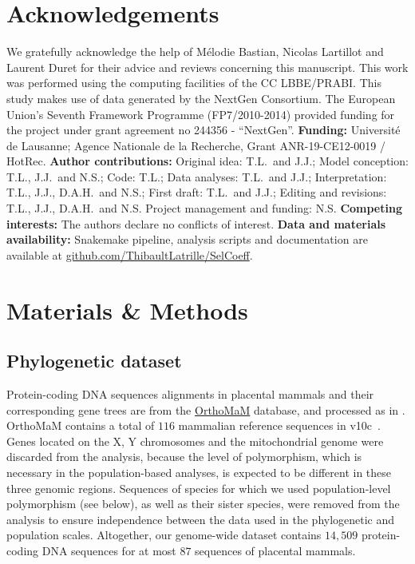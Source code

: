\documentclass{article}
\begin{document}
    \section*{Acknowledgements}
    \label{sec:acknowledgment}
    We gratefully acknowledge the help of Mélodie Bastian, Nicolas Lartillot and Laurent Duret for their advice and reviews concerning this manuscript.
    This work was performed using the computing facilities of the CC LBBE/PRABI\@.
    This study makes use of data generated by the NextGen Consortium.
    The European Union’s Seventh Framework Programme (FP7/2010-2014) provided funding for the project under grant agreement no 244356 - “NextGen”.
    \textbf{Funding:}
    Université de Lausanne; Agence Nationale de la Recherche, Grant ANR-19-CE12-0019 / HotRec.
    \textbf{Author contributions:}
    Original idea: T.L.\ and J.J.;
    Model conception: T.L., J.J.\ and N.S.;
    Code: T.L.;
    Data analyses: T.L.\ and J.J.;
    Interpretation: T.L., J.J., D.A.H.\ and N.S.;
    First draft: T.L.\ and J.J.;
    Editing and revisions: T.L., J.J., D.A.H.\ and N.S.
    Project management and funding: N.S\@.
    \textbf{Competing interests:}
    The authors declare no conflicts of interest.
    \textbf{Data and materials availability:}
    Snakemake pipeline, analysis scripts and documentation are available at \href{https://github.com/ThibaultLatrille/SelCoeff}{github.com/ThibaultLatrille/SelCoeff}.

    \section{Materials \& Methods}
    \label{sec:methods}

    \subsection{Phylogenetic dataset}

    Protein-coding DNA sequences alignments in placental mammals and their corresponding gene trees are from the \href{https://www.orthomam.univ-montp2.fr}{OrthoMaM} database, and processed as in \textcite{latrille_genes_2022}.
    OrthoMaM contains a total of $116$ mammalian reference sequences in v10c~\cite{ranwez_orthomam_2007, douzery_orthomam_2014, scornavacca_orthomam_2019}.
    Genes located on the X, Y chromosomes and the mitochondrial genome were discarded from the analysis, because the level of polymorphism, which is necessary in the population-based analyses, is expected to be different in these three genomic regions.
    Sequences of species for which we used population-level polymorphism (see below), as well as their sister species, were removed from the analysis to ensure independence between the data used in the phylogenetic and population scales.
    Altogether, our genome-wide dataset contains $14,509$ protein-coding DNA sequences for at most $87$ sequences of placental mammals.
\end{document}

